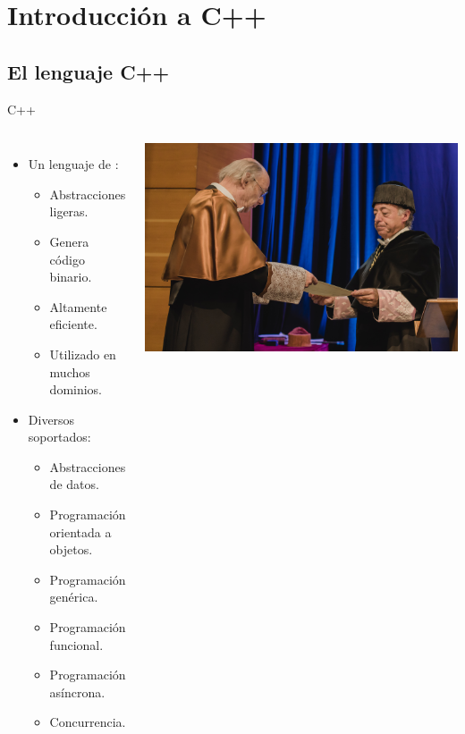 \section{Introducción a C++}

\subsection{El lenguaje C++}

\begin{frame}[t]{C++}
\begin{columns}[T]


\begin{itemize}
  \item Un lenguaje de :
    \begin{itemize}
      \item Abstracciones ligeras.
      \item Genera código binario.
      \item Altamente eficiente.
      \item Utilizado en muchos dominios.
    \end{itemize}

  \item Diversos  soportados:
    \begin{itemize}
      \item Abstracciones de datos.
      \item Programación orientada a objetos.
      \item Programación genérica.
      \item Programación funcional.
      \item Programación asíncrona.
      \item Concurrencia.
    \end{itemize}
\end{itemize}


\pause
\vspace{-1em}
\begin{center}
\includegraphics[width=.5\textwidth]{images/bjarne-honoris.jpg}
\end{center}


\end{columns}
\end{frame}
